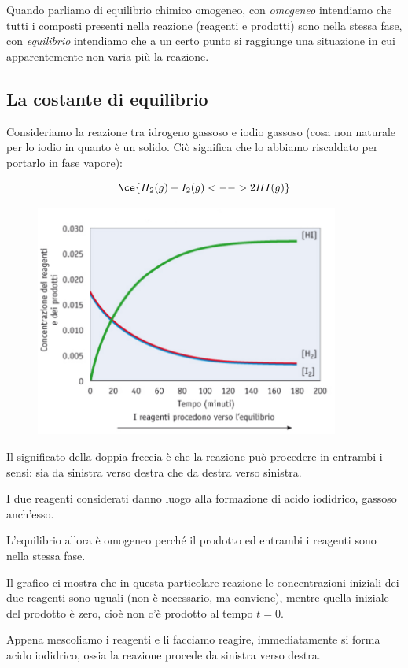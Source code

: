 Quando parliamo di equilibrio chimico omogeneo, con \textit{omogeneo} intendiamo che tutti i composti presenti nella reazione (reagenti e prodotti) sono nella stessa fase, con \textit{equilibrio} intendiamo che a un certo punto si raggiunge una situazione in cui apparentemente non varia più la reazione.
\subsection{La costante di equilibrio}
Consideriamo la reazione tra idrogeno gassoso e iodio gassoso (cosa non naturale per lo iodio in quanto è un solido. Ciò significa che lo abbiamo riscaldato per portarlo in fase vapore):

$$\ce{H_2(g) + I_2(g) <--> 2HI(g)}$$
\vspace{-1cm}\begin{figure}[htp]
    \centering
    \includegraphics[width=10cm]{immagini/equilibrio_chimico.png}
\end{figure}

Il significato della doppia freccia è che la reazione può procedere in entrambi i sensi: sia da sinistra verso destra che da destra verso sinistra.

I due reagenti considerati danno luogo alla formazione di acido iodidrico, gassoso anch'esso.

L'equilibrio allora è omogeneo perché il prodotto ed entrambi i reagenti sono nella stessa fase.

Il grafico ci mostra che in questa particolare reazione le concentrazioni iniziali dei due reagenti sono uguali (non è necessario, ma conviene), mentre quella iniziale del prodotto è zero, cioè non c'è prodotto al tempo $t=0$.

Appena mescoliamo i reagenti e li facciamo reagire, immediatamente si forma acido iodidrico, ossia la reazione procede da sinistra verso destra.

